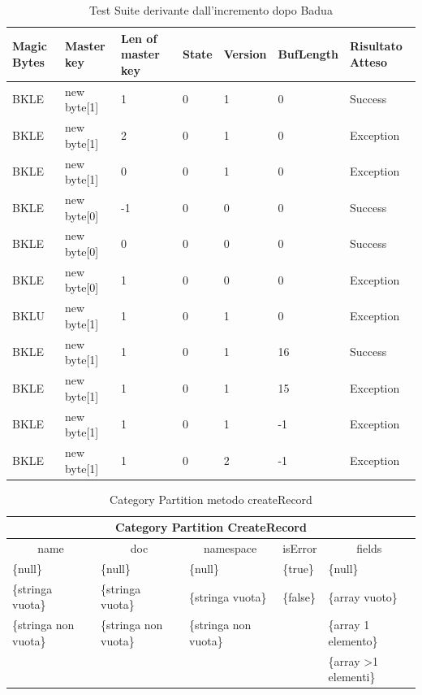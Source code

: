 \documentclass[12pt, a4paper]{article}
\begin{document}
\begin{table}[ht]
  \centering
  \caption[FileInfo: Test Suite - Adequacy Data Flow]{Test Suite derivante dall'incremento dopo Badua}
  \begin{tabular}{|l|l|l|l|l|l|l|}
    \hline
    \textbf{Magic Bytes} & \textbf{Master key} & \textbf{Len of master key}  & \textbf{State} & \textbf{Version} & \textbf{BufLength} & \textbf{Risultato Atteso} \\
    \hline
    BKLE & new byte[1] & 1 & 0 & 1 & 0 & Success \\
    BKLE & new byte[1] & 2 & 0 & 1 & 0 & Exception \\
    BKLE & new byte[1] & 0 & 0 & 1 & 0 & Exception \\
    BKLE & new byte[0] & -1 & 0 & 0 & 0 & Success \\
    BKLE & new byte[0] & 0 & 0 & 0 & 0 & Success \\
    BKLE & new byte[0] & 1 & 0 & 0 & 0 & Exception \\
    BKLU & new byte[1] & 1 & 0 & 1 & 0 & Exception \\
    BKLE & new byte[1] & 1 & 0 & 1 & 16 & Success \\
    BKLE & new byte[1] & 1 & 0 & 1 & 15 & Exception \\
    BKLE & new byte[1] & 1 & 0 & 1 & -1 & Exception \\
    BKLE & new byte[1] & 1 & 0 & 2 & -1 & Exception \\
    \hline
  \end{tabular}
  \label{tab:ADF1ReadHeader}
\end{table}



\begin{table}[ht]
  \centering
  \caption[Schema - Category Partition]{Category Partition metodo createRecord}
  \begin{tabular}{|l|l|l|l|l|}
  \hline
  \multicolumn{5}{|c|}{Category Partition CreateRecord}\\
  \hline
  \multicolumn{1}{|c|}{name} & \multicolumn{1}{|c|}{doc} & \multicolumn{1}{|c|}{namespace} & 
  \multicolumn{1}{|c|}{isError} & \multicolumn{1}{|c|}{fields} \\
  \hline
  \{null\} & \{null\} & \{null\} & \{true\} & \{null\} \\
  \{stringa vuota\} & \{stringa vuota\} & \{stringa vuota\} & \{false\} & \{array vuoto\} \\
  \{stringa non vuota\} & \{stringa non vuota\} & \{stringa non vuota\} & & \{array 1 elemento\} \\
  & & & & \{array \textgreater 1 elementi\} \\
  \hline
  \end{tabular}
  \label{tab:categoryPartitionCreateRecord}
\end{table}
\end{document}
